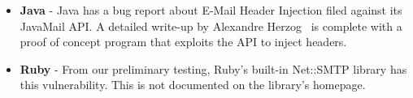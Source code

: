 \begin{itemize}
\item{\textbf{Java}} -
Java has a bug report about E-Mail Header Injection filed against its JavaMail API. A detailed write-up by Alexandre Herzog~\cite{Herzog.2014} is complete with a proof of concept program that exploits the API to inject headers.

\item{\textbf{Ruby}} -
From our preliminary testing, Ruby's built-in Net::SMTP library has this vulnerability. This is not documented on the library's homepage.

%

\end{itemize}
